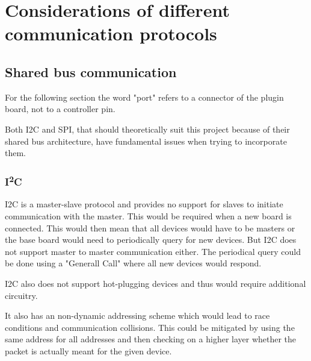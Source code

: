 \section{Considerations of different communication protocols}

\subsection{Shared bus communication}

For the following section the word "port" refers to a connector of the plugin board, not to a controller pin.

Both I2C and SPI, that should theoretically suit this project because of their shared bus architecture, have fundamental issues when trying to incorporate them.

\subsubsection{I\textsuperscript{2}C}

I2C is a master-slave protocol and provides no support for slaves to initiate communication with the master.
This would be required when a new board is connected.
This would then mean that all devices would have to be masters or the base board would need to periodically query for new devices.
But I2C does not support master to master communication either.
The periodical query could be done using a "Generall Call" where all new devices would respond.

I2C also does not support hot-plugging devices and thus would require additional circuitry.

It also has an non-dynamic addressing scheme which would lead to race conditions and communication collisions.
This could be mitigated by using the same address for all addresses and then checking on a higher layer whether the packet is actually meant for the given device.

